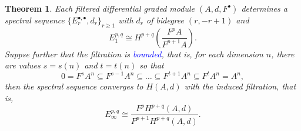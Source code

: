 \documentclass[11pt]{article}
\theoremstyle{thmstyle}
\newtheorem{theorem}{Theorem}
\theoremstyle{defstyle}
\newcommand{\define}[1]{\textcolor{blue}{\textit{#1}}}
\renewcommand{\ge}{\geqslant}
\begin{document}
\begin{theorem}
    Each filtered differential graded module $(A, d, F^\bullet)$ determines a spectral sequence $\{E^{\bullet, \bullet}_r, d_r\}_{r\ge 1}$ with $d_r$ of bidegree $(r, -r + 1)$ and 
    \begin{equation*}
        E^{p, q}_1\cong H^{p + q}\left(\frac{F^pA}{F^{p + 1}A}\right).
    \end{equation*}
    Suppse further that the filtration is \define{bounded}, that is, for each dimension $n$, there are values $s = s(n)$ and $t = t(n)$ so that 
    \begin{equation*}
        0 = F^s A^n\subseteq F^{s - 1}A^n\subseteq\dots \subseteq F^{t + 1} A^n\subseteq F^t A^n = A^n,
    \end{equation*}
    then the spectral sequence converges to $H(A, d)$ with the induced filtration, that is, 
    \begin{equation*}
        E^{p, q}_\infty\cong\frac{F^p H^{p + q}(A, d)}{F^{p + 1}H^{p + q}(A, d)}.
    \end{equation*}
\end{theorem}
\end{document}
